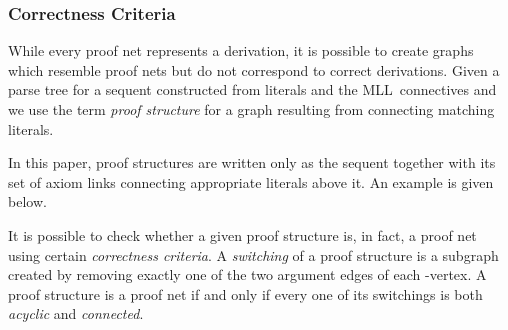 \documentclass{LMCS}
\theoremstyle{plain}\newtheorem*{cLm}{Claim}
\newcommand{\mll}{MLL} \newcommand{\mall}{MALL}
\newcommand{\p}{} \newcommand{\N}{\mathbb{N}}
\newcommand{\hughh}[1]{#1}
\begin{document}
\subsubsection{Correctness Criteria}

While every proof net represents a derivation, it is possible to
create graphs which resemble proof nets but do not correspond to
correct derivations. Given a parse tree for a sequent constructed
from literals and the \mll\ connectives  and  we
use the term {\em proof structure} for a graph resulting from
connecting matching literals.

\hughh{In this paper, proof structures are written only as the sequent together with its set of axiom links connecting appropriate literals above it. An example is given below.}
\begin{center} \vspace{5mm}
 \vspace{5mm}
\end{center}

\p It is possible to check whether a given proof structure is, in fact,
a proof net~\cite{DR89} using certain \emph{correctness criteria}. A
\emph{switching} of a proof structure is a subgraph created by
removing exactly one of the two argument edges of each
-vertex. A proof structure is a proof net if and only if every one of its
switchings is both {\em acyclic}\/ and {\em connected}.
\end{document}
